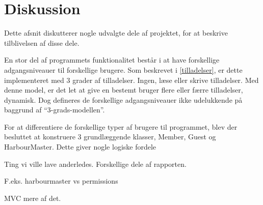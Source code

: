 \chapter{Diskussion}
\label{cha:diskussion}

Dette afsnit diskutterer nogle udvalgte dele af projektet, for at beskrive tilblivelsen af disse dele. 

En stor del af programmets funktionalitet består i at have forskellige adgangsniveauer til forskellige brugere. Som beskrevet i \cref{tilladelser}, er dette implementeret med 3 grader af tilladelser. Ingen, læse eller skrive tilladelser. Med denne model, er det let at give en bestemt bruger flere eller færre tilladelser, dynamisk.  Dog defineres de forskellige adgangsniveauer ikke udelukkende på baggrund af \enquote{3-grads-modellen}.

For at differentiere de forskellige typer af brugere til programmet, blev der besluttet at konstruere 3 grundlæggende klasser, Member, Guest og HarbourMaster. Dette giver nogle logiske fordele

Ting vi ville lave anderledes. Forskellige dele af rapporten.

F.eks. harbourmaster vs permissions

MVC mere af det.
